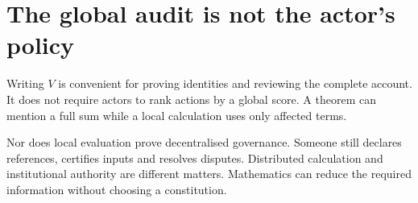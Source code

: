 \section{The global audit is not the actor's policy}
Writing $V$ is convenient for proving identities and reviewing the complete account. It does not require actors to rank actions by a global score. A theorem can mention a full sum while a local calculation uses only affected terms.

Nor does local evaluation prove decentralised governance. Someone still declares references, certifies inputs and resolves disputes. Distributed calculation and institutional authority are different matters. Mathematics can reduce the required information without choosing a constitution.


